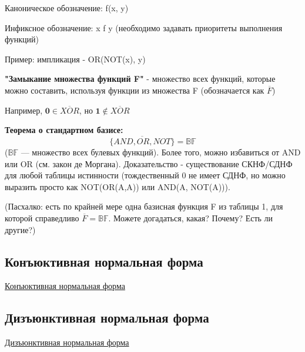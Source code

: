 Каноническое обозначение: 
f(x, y)

Инфиксное обозначение:
x f y (необходимо задавать приоритеты выполнения функций)

Пример: импликация - OR(NOT(x), y)

\textbf{"Замыкание множества функций F"} - множество всех функций, которые можно составить, используя функции из множества F (обозначается как $\overline{F}$)

Например, $\textbf{0} \in \overline{XOR}$, но $\textbf{1} \notin \overline{XOR}$

\textbf{Теорема о стандартном базисе:} 
\[ \overline{\{AND, OR, NOT\}} = \mathbb{BF} \] ($\mathbb{BF}$ --- множество всех булевых функций). Более того, можно избавиться от AND или OR (см. закон де Моргана). Доказательство - существование СКНФ/СДНФ для любой таблицы истинности (тождественный 0 не имеет СДНФ, но можно выразить просто как NOT(OR(A,A)) или AND(A, NOT(A))). 


(Пасхалко: есть по крайней мере одна базисная функция F из таблицы 1, для которой справедливо $ \overline{F} = \mathbb{BF} $. Можете догадаться, какая? Почему? Есть ли другие?) 

\subsection{Конъюктивная нормальная форма}
\href{https://ru.wikipedia.org/wiki/%D0%9A%D0%BE%D0%BD%D1%8A%D1%8E%D0%BD%D0%BA%D1%82%D0%B8%D0%B2%D0%BD%D0%B0%D1%8F_%D0%BD%D0%BE%D1%80%D0%BC%D0%B0%D0%BB%D1%8C%D0%BD%D0%B0%D1%8F_%D1%84%D0%BE%D1%80%D0%BC%D0%B0}{Конъюктивная нормальная форма}

\subsection{Дизъюнктивная нормальная форма}
\href{https://ru.wikipedia.org/wiki/%D0%94%D0%B8%D0%B7%D1%8A%D1%8E%D0%BD%D0%BA%D1%82%D0%B8%D0%B2%D0%BD%D0%B0%D1%8F_%D0%BD%D0%BE%D1%80%D0%BC%D0%B0%D0%BB%D1%8C%D0%BD%D0%B0%D1%8F_%D1%84%D0%BE%D1%80%D0%BC%D0%B0}{Дизъюнктивная нормальная форма}